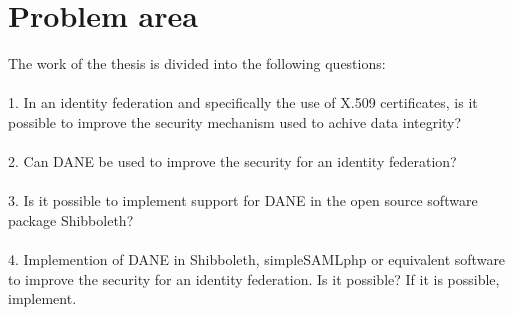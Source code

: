 


\section{Problem area}
The work of the thesis is divided into the following questions:
\\\\
1. In an identity federation and specifically the use of X.509 certificates,
is it possible to improve the security mechanism used to achive data integrity?
\\\\
2. Can DANE be used to improve the security for an identity federation? 
\\\\
3. Is it possible to implement support for DANE in the open source software package Shibboleth? 
\\\\
4. Implemention of DANE in Shibboleth, simpleSAMLphp or equivalent software to improve the security for an identity federation. Is it possible?
If it is possible, implement.


